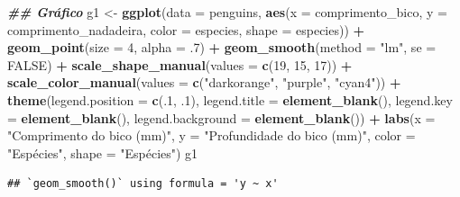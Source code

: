 \documentclass[
]{article}
\newenvironment{Shaded}{\begin{snugshade}}{\end{snugshade}}
\newcommand{\AttributeTok}[1]{\textcolor[rgb]{0.13,0.29,0.53}{#1}}
\newcommand{\ConstantTok}[1]{\textcolor[rgb]{0.56,0.35,0.01}{#1}}
\newcommand{\DecValTok}[1]{\textcolor[rgb]{0.00,0.00,0.81}{#1}}
\newcommand{\DocumentationTok}[1]{\textcolor[rgb]{0.56,0.35,0.01}{\textbf{\textit{#1}}}}
\newcommand{\FunctionTok}[1]{\textcolor[rgb]{0.13,0.29,0.53}{\textbf{#1}}}
\newcommand{\NormalTok}[1]{#1}
\newcommand{\OtherTok}[1]{\textcolor[rgb]{0.56,0.35,0.01}{#1}}
\newcommand{\SpecialCharTok}[1]{\textcolor[rgb]{0.81,0.36,0.00}{\textbf{#1}}}
\newcommand{\StringTok}[1]{\textcolor[rgb]{0.31,0.60,0.02}{#1}}
\begin{document}
\begin{Shaded}
\begin{Highlighting}[]
\DocumentationTok{\#\# Gráfico}
\NormalTok{g1 }\OtherTok{\textless{}{-}} \FunctionTok{ggplot}\NormalTok{(}\AttributeTok{data =}\NormalTok{ penguins, }
             \FunctionTok{aes}\NormalTok{(}\AttributeTok{x =}\NormalTok{ comprimento\_bico, }\AttributeTok{y =}\NormalTok{ comprimento\_nadadeira,}
                 \AttributeTok{color =}\NormalTok{ especies, }\AttributeTok{shape =}\NormalTok{ especies)) }\SpecialCharTok{+}
    \FunctionTok{geom\_point}\NormalTok{(}\AttributeTok{size =} \DecValTok{4}\NormalTok{, }\AttributeTok{alpha =}\NormalTok{ .}\DecValTok{7}\NormalTok{) }\SpecialCharTok{+}
    \FunctionTok{geom\_smooth}\NormalTok{(}\AttributeTok{method =} \StringTok{"lm"}\NormalTok{, }\AttributeTok{se =} \ConstantTok{FALSE}\NormalTok{) }\SpecialCharTok{+}
    \FunctionTok{scale\_shape\_manual}\NormalTok{(}\AttributeTok{values =} \FunctionTok{c}\NormalTok{(}\DecValTok{19}\NormalTok{, }\DecValTok{15}\NormalTok{, }\DecValTok{17}\NormalTok{)) }\SpecialCharTok{+}
    \FunctionTok{scale\_color\_manual}\NormalTok{(}\AttributeTok{values =} \FunctionTok{c}\NormalTok{(}\StringTok{"darkorange"}\NormalTok{, }\StringTok{"purple"}\NormalTok{, }\StringTok{"cyan4"}\NormalTok{)) }\SpecialCharTok{+}
    \FunctionTok{theme}\NormalTok{(}\AttributeTok{legend.position =} \FunctionTok{c}\NormalTok{(.}\DecValTok{1}\NormalTok{, .}\DecValTok{1}\NormalTok{),}
          \AttributeTok{legend.title =} \FunctionTok{element\_blank}\NormalTok{(),}
          \AttributeTok{legend.key =}  \FunctionTok{element\_blank}\NormalTok{(),}
          \AttributeTok{legend.background =} \FunctionTok{element\_blank}\NormalTok{()) }\SpecialCharTok{+}
    \FunctionTok{labs}\NormalTok{(}\AttributeTok{x =} \StringTok{"Comprimento do bico (mm)"}\NormalTok{, }\AttributeTok{y =} \StringTok{"Profundidade do bico (mm)"}\NormalTok{, }
         \AttributeTok{color =} \StringTok{"Espécies"}\NormalTok{, }\AttributeTok{shape =} \StringTok{"Espécies"}\NormalTok{)}
\NormalTok{g1}
\end{Highlighting}
\end{Shaded}

\begin{verbatim}
## `geom_smooth()` using formula = 'y ~ x'
\end{verbatim}
\end{document}
